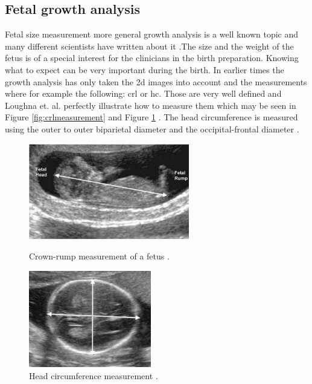 \subsection{Fetal growth analysis}\label{subsct:fetalGrowth}

Fetal size measurement more general growth analysis is a well known topic and many different scientists have written about it \cite{Hadlock1984EstimatingParameters.,Schild2000FetalUltrasound,Loughna2009,Whitworth2014}.The size and the weight of the fetus is of a special interest for the clinicians in the birth preparation. Knowing what to expect can be very important during the birth. In earlier times the growth analysis has only taken the \gls{2d} images into account and the measurements where for example the following: \gls{crl} or \gls{hc}. Those are very well defined and Loughna et. al. perfectly illustrate how to measure them which may be seen in Figure \ref{fig:crlmeasurement} and Figure \ref{fig:hc} \cite{Loughna2009}. The head circumference is measured using the outer to outer biparietal diameter and the occipital-frontal diameter \cite{Loughna2009}.

\begin{figure}[htb!]
    \begin{minipage}{7cm}
        \centering
        \includegraphics[width=7cm]{content/images/crlmeasurement}
        \caption{Crown-rump measurement of a fetus \cite{Loughna2009}.}
        \label{fig:crlmeasurement}
    \end{minipage}
    \hspace{0.02\textwidth}
    \begin{minipage}{7cm}
        \centering
        \includegraphics[width=5.35cm]{content/images/hc}
         \caption{Head circumference measurement  \cite{Loughna2009}.}
         \label{fig:hc}
    \end{minipage}
\end{figure}

